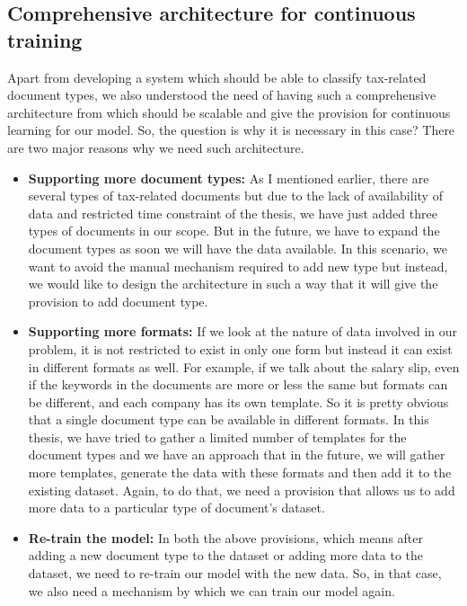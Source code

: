 \subsection{Comprehensive architecture for continuous training}
Apart from developing a system which should be able to classify tax-related document types, we also understood the need of having such a comprehensive architecture from which should be scalable and give the provision for continuous learning for our model. So, the question is why it is necessary in this case? There are two major reasons why we need such architecture.
\begin{itemize}
  \item \textbf{Supporting more document types:} As I mentioned earlier, there are several types of tax-related documents but due to the lack of availability of data and restricted time constraint of the thesis, we have just added three types of documents in our scope. But in the future, we have to expand the document types as soon we will have the data available. In this scenario, we want to avoid the manual mechanism required to add new type but instead, we would like to design the architecture in such a way that it will give the provision to add document type.
  
  \item  \textbf{ Supporting more formats:} If we look at the nature of data involved in our problem, it is not restricted to exist in only one form but instead it can exist in different formats as well. For example, if we talk about the salary slip, even if the keywords in the documents are more or less the same but formats can be different, and each company has its own template. So it is pretty obvious that a single document type can be available in different formats. In this thesis, we have tried to gather a limited number of templates for the document types and we have an approach that in the future, we will gather more templates, generate the data with these formats and then add it to the existing dataset. Again, to do that, we need a provision that allows us to add more data to a particular type of document's dataset.
  
  \item \textbf{Re-train the model:} In both the above provisions, which means after adding a new document type to the dataset or adding more data to the dataset, we need to re-train our model with the new data. So, in that case, we also need a mechanism by which we can train our model again.
\end{itemize}
